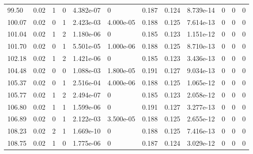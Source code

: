 \documentclass[preview]{standalone}
\begin{document}
{{{\begin{tabular}{L{1.2cm}C{1.2cm} C{0.3cm}C{0.5cm} C{1.4cm}C{1.4cm} C{1.4cm}C{1.4cm} C{1.6cm}C{1.6cm} C{1.6cm}C{1.6cm}}
  99.50  &  0.02  & 1     &  0 &  4.382e-07  & 0  &  0.187&   0.124& 8.739e-14 & 0   &  0 & 0  \\ 
  100.07  &  0.02  & 0     &  1 &  2.423e-03  & 4.000e-05  &  0.188&   0.125& 7.614e-13 & 0   &  0 & 0  \\ 
  101.04  &  0.02  & 1     &  2 &  1.180e-06  & 0  &  0.185&   0.123& 1.151e-12 & 0   &  0 & 0  \\ 
  101.70  &  0.02  & 0     &  1 &  5.501e-05  & 1.000e-06  &  0.188&   0.125& 8.710e-13 & 0   &  0 & 0  \\ 
  102.18  &  0.02  & 1     &  2 &  1.421e-06  & 0  &  0.185&   0.123& 3.436e-13 & 0   &  0 & 0  \\ 
  104.48  &  0.02  & 0     &  0 &  1.088e-03  & 1.800e-05  &  0.191&   0.127& 9.034e-13 & 0   &  0 & 0  \\ 
  105.37  &  0.02  & 0     &  1 &  2.516e-04  & 4.000e-06  &  0.188&   0.125& 1.065e-12 & 0   &  0 & 0  \\ 
  105.77  &  0.02  & 1     &  2 &  2.494e-07  & 0  &  0.185&   0.123& 2.058e-12 & 0   &  0 & 0  \\ 
  106.80  &  0.02  & 1     &  1 &  1.599e-06  & 0  &  0.191&   0.127& 3.277e-13 & 0   &  0 & 0  \\ 
  106.89  &  0.02  & 0     &  1 &  2.122e-03  & 3.500e-05  &  0.188&   0.125& 2.655e-12 & 0   &  0 & 0  \\ 
  108.23  &  0.02  & 2     &  1 &  1.669e-10  & 0  &  0.188&   0.125& 7.416e-13 & 0   &  0 & 0  \\ 
  108.75  &  0.02  & 1     &  0 &  1.775e-06  & 0  &  0.187&   0.124& 3.029e-12 & 0   &  0 & 0  \\ 
\hline 
\end{tabular} 

}}}
\end{document}
